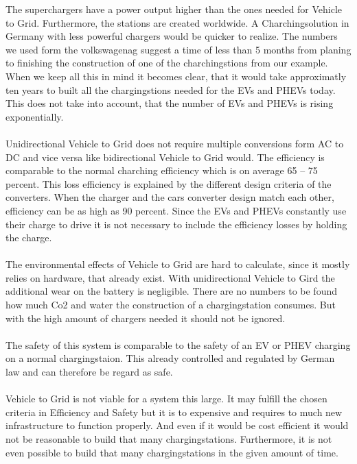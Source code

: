 \begin{parcolumns}[colwidths={1=2.5 cm, 2=10 cm, 3=2.5cm}]{3}
{%
The superchargers have a power output higher than the ones needed for Vehicle to Grid. Furthermore, the stations are created worldwide. A Charchingsolution in Germany with less powerful chargers would be quicker to realize. The numbers we used form the volkswagenag suggest a time of less than 5 months from planing to finishing the construction of one of the charchingstions from our example. When we keep all this in mind it becomes clear, that it would take approximatly ten years to built all the chargingstions needed for the EVs and PHEVs today. This does not take into account, that the number of EVs and PHEVs is rising exponentially.
\\ \\
\noindent
Unidirectional Vehicle to Grid does not require multiple conversions form AC to DC and vice versa like bidirectional Vehicle to Grid would. The efficiency is comparable to the normal charching efficiency which is on average 65 – 75 percent. This loss efficiency is explained by the different design criteria of the converters. When the charger and the cars converter design match each other, efficiency can be as high as 90 percent. Since the EVs and PHEVs constantly use their charge to drive it is not necessary to include the efficiency losses by holding the charge.%
\\ \\
\noindent
The environmental effects of Vehicle to Grid are hard to calculate, since it mostly relies on hardware, that already exist. With unidirectional Vehicle to Gird the additional wear on the battery is negligible. There are no numbers to be found how much Co2 and water the construction of a chargingstation consumes. But with the high amount of chargers needed it should not be ignored.
\\ \\
\noindent
The safety of this system is comparable to the safety of an EV or PHEV charging on a normal chargingstaion. This already controlled and regulated by German law and can therefore be regard as safe.%
\\ \\
\noindent
Vehicle to Grid is not viable for a system this large. It may fulfill the chosen criteria in Efficiency and Safety but it is to expensive and requires to much new infrastructure to function properly. And even if it would be cost efficient it would not be reasonable to build that many chargingstations. Furthermore, it is not even possible to build that many chargingstations in the given amount of time.
}
\end{parcolumns}
